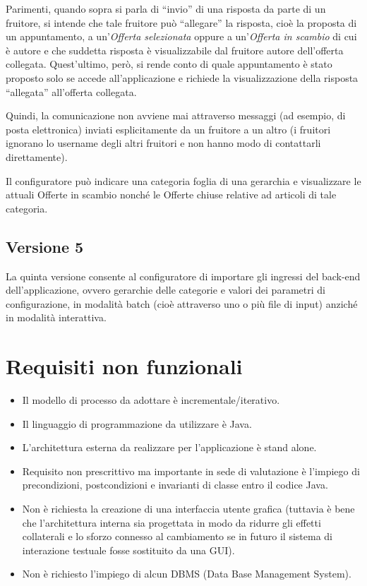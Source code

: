 Parimenti, quando sopra si parla di “invio” di una risposta da parte di un fruitore, si intende che tale fruitore può “allegare” la risposta, cioè la proposta di un appuntamento, a un’\textit{Offerta selezionata} oppure a un’\textit{Offerta in scambio} di cui è autore e che suddetta risposta è visualizzabile dal fruitore autore dell’offerta collegata. 
Quest’ultimo, però, si rende conto di quale appuntamento è stato proposto solo se accede all’applicazione e richiede la visualizzazione della risposta “allegata” all’offerta collegata. 

Quindi, la comunicazione non avviene mai attraverso messaggi (ad esempio, di posta elettronica) inviati esplicitamente da un fruitore a un altro (i fruitori ignorano lo username degli altri fruitori e non hanno modo di contattarli direttamente). \newline

Il configuratore può indicare una categoria foglia di una gerarchia e visualizzare le attuali Offerte in scambio nonché le Offerte chiuse relative ad articoli di tale categoria. 

\subsection{Versione 5}
La quinta versione consente al configuratore di importare gli ingressi del back-end dell’applicazione, ovvero gerarchie delle categorie e valori dei parametri di configurazione, in modalità batch (cioè attraverso uno o più file di input) anziché in modalità interattiva.

\section{Requisiti non funzionali}
\begin{itemize}
    \item Il modello di processo da adottare è incrementale/iterativo.
    \item Il linguaggio di programmazione da utilizzare è Java.
    \item L’architettura esterna da realizzare per l’applicazione è stand alone.
    \item Requisito non prescrittivo ma importante in sede di valutazione è l’impiego di precondizioni, postcondizioni e invarianti di classe entro il codice Java.
    \item Non è richiesta la creazione di una interfaccia utente grafica (tuttavia è bene che l’architettura interna sia progettata in modo da ridurre gli effetti collaterali e lo sforzo connesso al cambiamento se in futuro il sistema di interazione testuale fosse sostituito da una GUI).
    \item Non è richiesto l’impiego di alcun DBMS (Data Base Management System).
\end{itemize}

